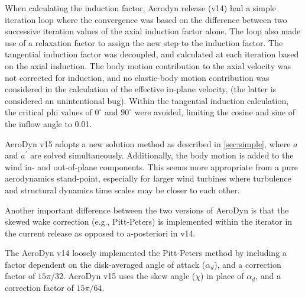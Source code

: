\documentclass[]{aiaa-tc}%
\begin{document}
When calculating the induction factor, Aerodyn release (v14) had a simple iteration loop where the convergence was based on the difference between two successive iteration values of the axial induction factor alone.  The loop also made use of a relaxation factor to assign the new step to the induction factor.  The tangential induction factor was decoupled, and calculated at each iteration based on the axial induction. The body motion contribution to the axial velocity was not corrected for induction, and no elastic-body motion contribution was considered in the calculation of the effective in-plane velocity, (the latter is considered an unintentional bug).  Within the tangential induction calculation, the critical phi values of $0^\circ$ and $90^\circ$ were avoided, limiting the cosine and sine of the inflow angle to 0.01.

AeroDyn v15 adopts a new solution method as described in \cref{sec:simple}, where $a$ and $a^\prime$ are solved simultaneously. Additionally, the body motion is added to the wind in- and out-of-plane components.  This seems more appropriate from a pure aerodynamics stand-point, especially for larger wind turbines where turbulence and structural dynamics time scales may be closer to each other.  


Another important difference between the two versions of AeroDyn is that the skewed wake correction (e.g., Pitt-Peters) is implemented within the iterator in the current release as opposed to a-posteriori in v14. %

The AeroDyn v14 loosely implemented the Pitt-Peters method by including a factor dependent on the disk-averaged angle of attack ($\alpha_d$), and a correction factor of $15 \pi / 32$. AeroDyn v15 uses the skew angle ($\chi$) in place of $\alpha_d$, and a correction factor of $15 \pi / 64$.





\end{document}
